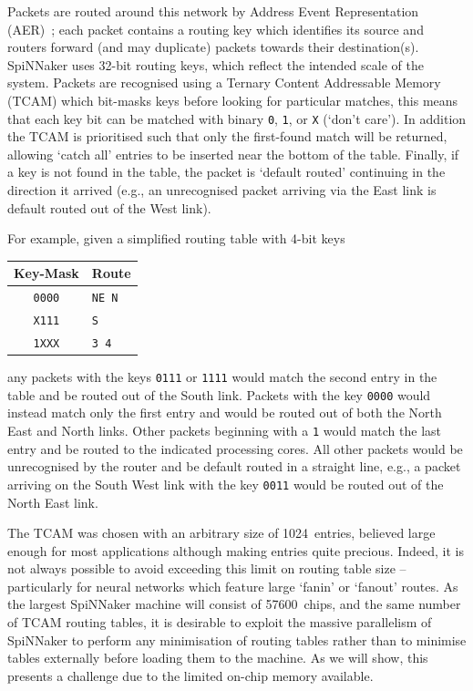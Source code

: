 \documentclass[conference]{IEEEtran}
\newcommand{\mytt}[1]{\texttt{\footnotesize#1}}
\begin{document}
Packets are routed around this network by Address Event Representation (AER)~\parencite{Boahen2000}; each packet contains a routing key which identifies its source and routers forward (and may duplicate) packets towards their destination(s).
SpiNNaker uses 32-bit routing keys, which reflect the intended scale of the system.
Packets are recognised using a Ternary Content Addressable Memory (TCAM) which bit-masks keys before looking for particular matches,
this means that each key bit can be matched with binary \mytt{0}, \mytt{1}, or \mytt{X} (`don't care').
In addition the TCAM is prioritised such that only the first-found match will be returned, allowing `catch all' entries to be inserted near the bottom of the table.
Finally, if a key is not found in the table, the packet is `default routed' continuing in the direction it arrived (e.g., an unrecognised packet arriving via the East link is default routed out of the West link).

For example, given a simplified routing table with 4-bit keys

\begin{table}[H]
  \centering
  \begin{tabular}{c l}
    \toprule
    Key-Mask & Route \\
    \midrule
    \texttt{0000} & \texttt{NE N}\\
    \texttt{X111} & \texttt{S}\\
    \texttt{1XXX} & \texttt{3 4}\\
    \bottomrule
  \end{tabular}
\end{table}

\noindent any packets with the keys \mytt{0111} or \mytt{1111} would match the second entry in the table and be routed out of the South link.
Packets with the key \mytt{0000} would instead match only the first entry and would be routed out of both the North East and North links.
Other packets beginning with a \mytt{1} would match the last entry and be routed to the indicated processing cores.
All other packets would be unrecognised by the router and be default routed in a straight line, e.g., a packet arriving on the South West link with the key \mytt{0011} would be routed out of the North East link.

The TCAM was chosen with an arbitrary size of \num{1024}~entries, believed large enough for most applications although making entries quite precious.
Indeed, it is not always possible to avoid exceeding this limit on routing table size -- particularly for neural networks which feature large `fanin' or `fanout' routes.
As the largest SpiNNaker machine will consist of \num{57600}~chips, and the same number of TCAM routing tables, it is desirable to exploit the massive parallelism of SpiNNaker to perform any minimisation of routing tables rather than to minimise tables externally before loading them to the machine. As we will show, this presents a challenge due to the limited on-chip memory available.
\end{document}
